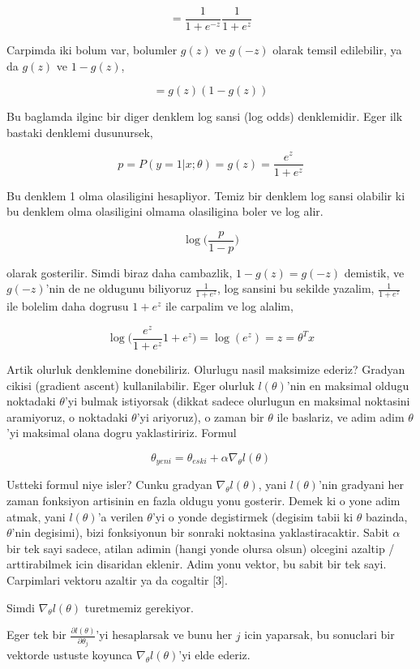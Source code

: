 \documentclass[12pt,fleqn]{article}\usepackage{../common}
\begin{document}
$$
 = \frac{1}{1+e^{-z}} \frac{1}{1+e^{z}}
 $$

Carpimda iki bolum var, bolumler $g(z)$ ve $g(-z)$ olarak temsil
edilebilir, ya da  $g(z)$ ve $1-g(z)$, 

$$
 = g(z)(1-g(z))
$$

Bu baglamda ilginc bir diger denklem log sansi (log odds) denklemidir. Eger
ilk bastaki denklemi dusunursek,

$$ p = P(y=1|x;\theta) = g(z) = \frac{e^{z}}{1+e^{z}}  $$

Bu denklem 1 olma olasiligini hesapliyor. Temiz bir denklem log sansi
olabilir ki bu denklem olma olasiligini olmama olasiligina boler ve log alir.

$$ \log \bigg( \frac{p}{1-p} \bigg)$$

olarak gosterilir. Simdi biraz daha cambazlik, $1 - g(z) = g(-z)$ demistik,
ve $g(-z)$'nin de ne oldugunu biliyoruz $\frac{1}{1+e^{z}}$, log sansini bu
sekilde yazalim, $\frac{1}{1+e^{z}}$ ile bolelim daha dogrusu $1+e^{z}$ ile
carpalim ve log alalim,

$$ \log \bigg( \frac{e^{z}}{1+e^{z}} 1+e^{z}  \bigg) = \log(e^{z}) = z = \theta^Tx$$

Artik olurluk denklemine donebiliriz. Olurlugu nasil maksimize ederiz?
Gradyan cikisi (gradient ascent) kullanilabilir. Eger olurluk
$l(\theta)$'nin en maksimal oldugu noktadaki $\theta$'yi bulmak
istiyorsak (dikkat sadece olurlugun en maksimal noktasini aramiyoruz,
o noktadaki $\theta$'yi ariyoruz), o zaman bir $\theta$ ile baslariz,
ve adim adim $\theta$'yi maksimal olana dogru yaklastiririz. Formul

$$ \theta_{yeni} = \theta_{eski} + \alpha \nabla_\theta l(\theta)$$

Ustteki formul niye isler? Cunku gradyan $\nabla_\theta l(\theta)$,
yani $l(\theta)$'nin gradyani her zaman fonksiyon artisinin en fazla
oldugu yonu gosterir. Demek ki o yone adim atmak, yani $l(\theta)$'a
verilen $\theta$'yi o yonde degistirmek (degisim tabii ki $\theta$
bazinda, $\theta$'nin degisimi), bizi fonksiyonun bir sonraki
noktasina yaklastiracaktir. Sabit $\alpha$ bir tek sayi sadece, atilan
adimin (hangi yonde olursa olsun) olcegini azaltip / arttirabilmek
icin disaridan eklenir. Adim yonu vektor, bu sabit bir tek
sayi. Carpimlari vektoru azaltir ya da cogaltir [3].

Simdi $\nabla_\theta l(\theta)$ turetmemiz gerekiyor.

Eger tek bir $\frac{\partial l(\theta)}{\partial \theta_j}$'yi
hesaplarsak ve bunu her $j$ icin yaparsak, bu sonuclari bir vektorde
ustuste koyunca $\nabla_\theta l(\theta)$'yi elde ederiz.
\end{document}
